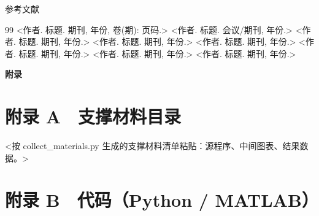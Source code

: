 \documentclass[11pt]{ctexart}
\begin{document}

\renewcommand{\refname}{}
\begin{center}
{\heiti 参考文献}
\end{center}
\vspace{1.0ex}
\begin{thebibliography}{99}
 <作者. 标题. 期刊, 年份, 卷(期): 页码.>
 <作者. 标题. 会议/期刊, 年份.>
 <作者. 标题. 期刊, 年份.>
 <作者. 标题. 期刊, 年份.>
 <作者. 标题. 期刊, 年份.>
 <作者. 标题. 期刊, 年份.>
 <作者. 标题. 期刊, 年份.>
 <作者. 标题. 期刊, 年份.>
\end{thebibliography}

\begin{center}
{\Large\bfseries 附录}
\end{center}

\section*{附录 A　支撑材料目录}
<按 collect\_materials.py 生成的支撑材料清单粘贴：源程序、中间图表、结果数据。>

\section*{附录 B　代码（Python / MATLAB）}
\lstset{
  basicstyle=\ttfamily\small,
  numbers=left,
  numberstyle=\tiny,
  stepnumber=1,
  breaklines=true,
  showstringspaces=false,
  frame=single,
  language=Python
}
\end{document}
